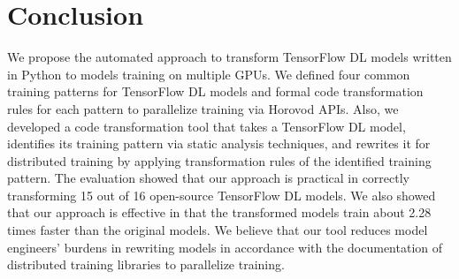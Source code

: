 \section{Conclusion}\label{sec:conclusion}
We propose the automated approach to transform TensorFlow DL models written in
Python to models training on multiple GPUs.
We defined four common training patterns for TensorFlow DL models and formal
code transformation rules for each pattern to parallelize training via Horovod
APIs.
Also, we developed a code transformation tool that takes a TensorFlow DL model,
identifies its training pattern via static analysis techniques, and rewrites
it for distributed training by applying transformation rules of the identified
training pattern.
The evaluation showed that our approach is practical in correctly transforming
15 out of 16 open-source TensorFlow DL models.
We also showed that our approach is effective in that the transformed models
train about 2.28 times faster than the original models.
We believe that our tool reduces model engineers' burdens in rewriting models
in accordance with the documentation of distributed training libraries to
parallelize training.







